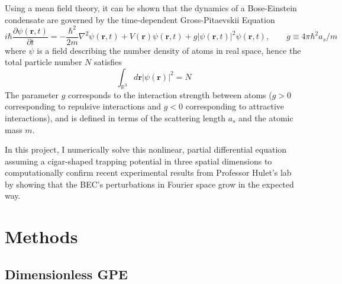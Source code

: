 \documentclass[12]{article}
\begin{document}
Using a mean field theory, it can be shown that the dynamics of a Bose-Einstein condensate are governed by the time-dependent Gross-Pitaevskii Equation \cite{pethick2008bose}
\begin{equation}
i \hbar \frac{\partial \psi(\mathbf{r}, t)}{\partial t}=-\frac{\hbar^{2}}{2 m} \nabla^{2} \psi(\mathbf{r}, t)+V(\mathbf{r}) \psi(\mathbf{r}, t)+ g|\psi(\mathbf{r}, t)|^{2} \psi(\mathbf{r}, t), \quad \quad g \equiv 4 \pi \hbar^{2} a_{s} / m
\label{DimGPE3D}
\end{equation}
\nolinebreak
where $\psi$ is a field describing the number density of atoms in real space, hence the total particle number $N$ satisfies
\begin{equation}
\int_{\mathbb{R}^{3}} d \mathbf{r}|\psi(\mathbf{r})|^{2} = N
\end{equation}
The parameter $g$ corresponds to the interaction strength between atoms ($g>0$ corresponding to repulsive interactions and $g < 0$ corresponding to attractive interactions), and is defined in terms of the scattering length $a_s$ and the atomic mass $m$.

In this project, I numerically solve this nonlinear, partial differential equation assuming a cigar-shaped trapping potential in three spatial dimensions to computationally confirm recent experimental results from Professor Hulet's lab by showing that the BEC's perturbations in Fourier space grow in the expected way.

\section{Methods}

\subsection{Dimensionless GPE}
\label{sec:DimGPE}
\end{document}
